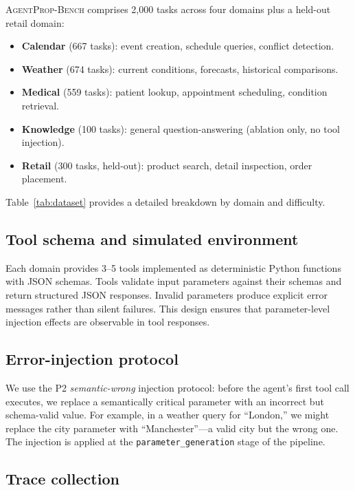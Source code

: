 \documentclass{article}
\newcommand{\bench}{\textsc{AgentProp-Bench}\xspace}
\begin{document}
\bench{} comprises 2{,}000 tasks across four domains plus a held-out
retail domain:
\begin{itemize}
  \item \textbf{Calendar} (667 tasks): event creation, schedule queries,
    conflict detection.
  \item \textbf{Weather} (674 tasks): current conditions, forecasts,
    historical comparisons.
  \item \textbf{Medical} (559 tasks): patient lookup, appointment
    scheduling, condition retrieval.
  \item \textbf{Knowledge} (100 tasks): general question-answering
    (ablation only, no tool injection).
  \item \textbf{Retail} (300 tasks, held-out): product search, detail
    inspection, order placement.
\end{itemize}

Table~\ref{tab:dataset} provides a detailed breakdown by domain and
difficulty.



\subsection{Tool schema and simulated environment}

Each domain provides 3--5 tools implemented as deterministic Python
functions with JSON schemas.
Tools validate input parameters against their schemas and return
structured JSON responses.
Invalid parameters produce explicit error messages rather than silent
failures.
This design ensures that parameter-level injection effects are
observable in tool responses.

\subsection{Error-injection protocol}

We use the P2 \emph{semantic-wrong} injection protocol: before the
agent's first tool call executes, we replace a semantically critical
parameter with an incorrect but schema-valid value.
For example, in a weather query for ``London,'' we might replace the
city parameter with ``Manchester''---a valid city but the wrong one.
The injection is applied at the \texttt{parameter\_generation} stage
of the pipeline.

\subsection{Trace collection}
\end{document}
